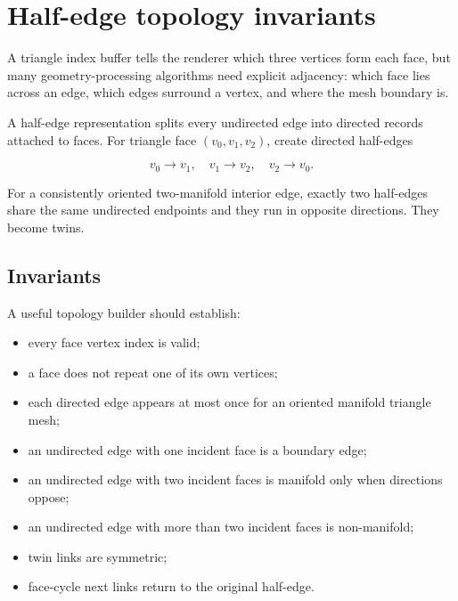 \hypertarget{appendix-faac749c9cdd}{}\label{referencestart:appendix-faac749c9cdd}
\section{Half-edge topology invariants}\label{appendix-faac749c9cdd-half-edge-topology-invariants}

\hypertarget{appendix-faac749c9cdd-half-edge-topology-invariants}{}

A triangle index buffer tells the renderer which three vertices form each face, but many geometry-processing algorithms need explicit adjacency: which face lies across an edge, which edges surround a vertex, and where the mesh boundary is.

A half-edge representation splits every undirected edge into directed records attached to faces. For triangle face \((v_0,v_1,v_2)\), create directed half-edges

\[
v_0\rightarrow v_1,\quad
v_1\rightarrow v_2,\quad
v_2\rightarrow v_0.
\]

For a consistently oriented two-manifold interior edge, exactly two half-edges share the same undirected endpoints and they run in opposite directions. They become twins.

\subsection{Invariants}\label{appendix-faac749c9cdd-invariants}

\hypertarget{appendix-faac749c9cdd-invariants}{}

A useful topology builder should establish:

\begin{itemize}
\tightlist
\item
  every face vertex index is valid;
\item
  a face does not repeat one of its own vertices;
\item
  each directed edge appears at most once for an oriented manifold triangle mesh;
\item
  an undirected edge with one incident face is a boundary edge;
\item
  an undirected edge with two incident faces is manifold only when directions oppose;
\item
  an undirected edge with more than two incident faces is non-manifold;
\item
  twin links are symmetric;
\item
  face-cycle next links return to the original half-edge.
\end{itemize}

